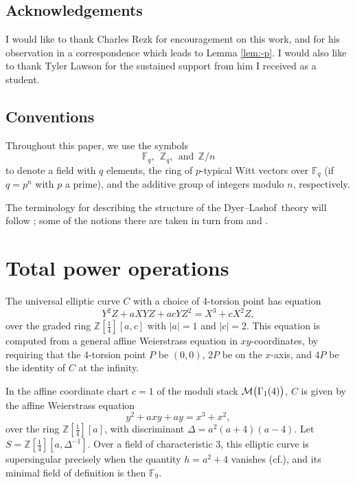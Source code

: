 \documentclass{gtpart}
\theoremstyle{definition}
\theoremstyle{remark}
\newcommand{\mb}[1]{\mathbb{#1}}
\newcommand{\cff}[2]{cf.\thinspace{\cite[#1]{#2}}}
\newcommand{\DL}{Dyer--Lashof~}
\newcommand{\BF}{{\mb F}}
\newcommand{\BZ}{{\mb Z}}
\newcommand{\CM}{{\cal M}}
\newcommand{\G}{\Gamma}
\begin{document}
\subsection*{Acknowledgements}

I would like to thank Charles Rezk for encouragement on this work, and for his observation in a correspondence which leads to Lemma \ref{lem:-p}.  
I would also like to thank Tyler Lawson for the sustained support from him I received as a student.  


\subsection*{Conventions}

Throughout this paper, we use the symbols 
\[
 \BF_q,~~\BZ_q,~~\text{and}~~\BZ/n 
\]
to denote a field with $q$ elements, the ring of $p$-typical Witt vectors over $\BF_q$ (if $q = p^n$ with $p$ a prime), and the additive group of integers modulo $n$, respectively.  

The terminology for describing the structure of the \DL theory will follow \cite{cong, h2p2}; 
some of the notions there are taken in turn from \cite{BW} and \cite{V}.  


\section{Total power operations}
\label{sec:psi}

The universal elliptic curve $C$ with a choice of 4-torsion point has equation 
\[
 Y^2 Z + a X Y Z + a c Y Z^2 = X^3 + c X^2 Z, 
\]
over the graded ring $\BZ [\frac{1}{4}] [a,c]$ with $|a| = 1$ and $|c| = 2$.  
This equation is computed from a general affine Weierstrass equation in $xy$-coordinates, 
by requiring that the 4-torsion point $P$ be $(0,0)$, $2P$ be on the $x$-axis, and $4P$ be the identity of $C$ at the infinity.  

In the affine coordinate chart $c = 1$ of the moduli stack $\CM \big(\G_1(4)\big)$, 
$C$ is given by the affine Weierstrass equation 
\[
 y^2 + a x y + a y = x^3 + x^2, 
\]
over the ring $\BZ [\frac{1}{4}] [a]$, with discriminant $\Delta = a^2 (a + 4) (a - 4)$.  
Let $S = \BZ [\frac{1}{4}] [a, \Delta^{-1}]$.  
Over a field of characteristic 3, this elliptic curve is supersingular precisely when the quantity $h = a^2 + 4$ vanishes (\cff{V.4.1a}{AEC}), 
and its minimal field of definition is then $\BF_9$.  
\end{document}
